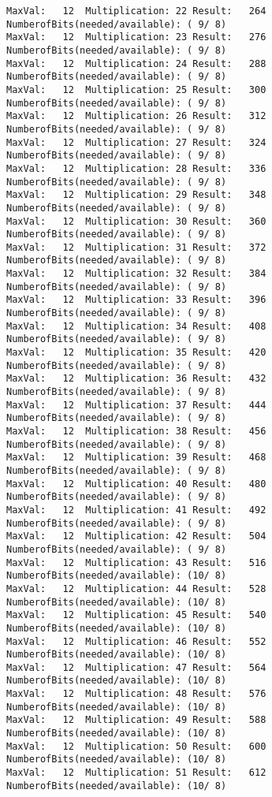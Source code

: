 \documentclass{article}
\begin{document}
\begin{Verbatim}[commandchars=\\\{\}]
MaxVal:   12  Multiplication: 22 Result:   264 NumberofBits(needed/available): ( 9/ 8)
MaxVal:   12  Multiplication: 23 Result:   276 NumberofBits(needed/available): ( 9/ 8)
MaxVal:   12  Multiplication: 24 Result:   288 NumberofBits(needed/available): ( 9/ 8)
MaxVal:   12  Multiplication: 25 Result:   300 NumberofBits(needed/available): ( 9/ 8)
MaxVal:   12  Multiplication: 26 Result:   312 NumberofBits(needed/available): ( 9/ 8)
MaxVal:   12  Multiplication: 27 Result:   324 NumberofBits(needed/available): ( 9/ 8)
MaxVal:   12  Multiplication: 28 Result:   336 NumberofBits(needed/available): ( 9/ 8)
MaxVal:   12  Multiplication: 29 Result:   348 NumberofBits(needed/available): ( 9/ 8)
MaxVal:   12  Multiplication: 30 Result:   360 NumberofBits(needed/available): ( 9/ 8)
MaxVal:   12  Multiplication: 31 Result:   372 NumberofBits(needed/available): ( 9/ 8)
MaxVal:   12  Multiplication: 32 Result:   384 NumberofBits(needed/available): ( 9/ 8)
MaxVal:   12  Multiplication: 33 Result:   396 NumberofBits(needed/available): ( 9/ 8)
MaxVal:   12  Multiplication: 34 Result:   408 NumberofBits(needed/available): ( 9/ 8)
MaxVal:   12  Multiplication: 35 Result:   420 NumberofBits(needed/available): ( 9/ 8)
MaxVal:   12  Multiplication: 36 Result:   432 NumberofBits(needed/available): ( 9/ 8)
MaxVal:   12  Multiplication: 37 Result:   444 NumberofBits(needed/available): ( 9/ 8)
MaxVal:   12  Multiplication: 38 Result:   456 NumberofBits(needed/available): ( 9/ 8)
MaxVal:   12  Multiplication: 39 Result:   468 NumberofBits(needed/available): ( 9/ 8)
MaxVal:   12  Multiplication: 40 Result:   480 NumberofBits(needed/available): ( 9/ 8)
MaxVal:   12  Multiplication: 41 Result:   492 NumberofBits(needed/available): ( 9/ 8)
MaxVal:   12  Multiplication: 42 Result:   504 NumberofBits(needed/available): ( 9/ 8)
MaxVal:   12  Multiplication: 43 Result:   516 NumberofBits(needed/available): (10/ 8)
MaxVal:   12  Multiplication: 44 Result:   528 NumberofBits(needed/available): (10/ 8)
MaxVal:   12  Multiplication: 45 Result:   540 NumberofBits(needed/available): (10/ 8)
MaxVal:   12  Multiplication: 46 Result:   552 NumberofBits(needed/available): (10/ 8)
MaxVal:   12  Multiplication: 47 Result:   564 NumberofBits(needed/available): (10/ 8)
MaxVal:   12  Multiplication: 48 Result:   576 NumberofBits(needed/available): (10/ 8)
MaxVal:   12  Multiplication: 49 Result:   588 NumberofBits(needed/available): (10/ 8)
MaxVal:   12  Multiplication: 50 Result:   600 NumberofBits(needed/available): (10/ 8)
MaxVal:   12  Multiplication: 51 Result:   612 NumberofBits(needed/available): (10/ 8)

\end{Verbatim}
\end{document}
